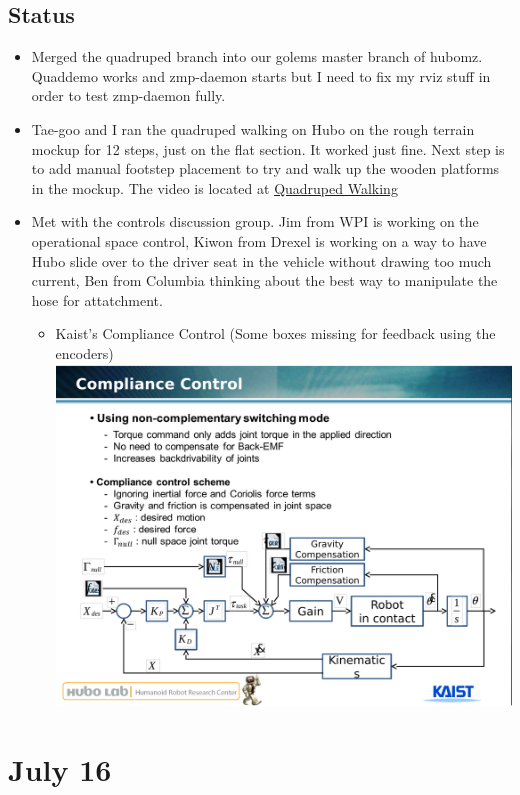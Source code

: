 \documentclass[letterpaper, 10 pt]{report}
\begin{document}
\subsection*{Status}
\begin{itemize}
\item Merged the quadruped branch into our golems master branch of hubomz. Quaddemo works and zmp-daemon starts but I need to fix my rviz stuff in order to test zmp-daemon fully.
\item Tae-goo and I ran the quadruped walking on Hubo on the rough terrain mockup for 12 steps, just on the flat section. It worked just fine. Next step is to add manual footstep placement to try and walk up the wooden platforms in the mockup.
The video is located at \href{http://www.youtube.com/watch?v=zqZra1Jmt9g&feature=youtu.be}{Quadruped Walking}
\item Met with the controls discussion group. Jim from WPI is working on the operational space control, Kiwon from Drexel is working on a way to have Hubo slide over to the driver seat in the vehicle without drawing too much current, Ben from Columbia thinking about the best way to manipulate the hose for attatchment.
\begin{itemize}
\item Kaist's Compliance Control (Some boxes missing for feedback using the encoders)
\newline \includegraphics[width=14.0cm]{resources/compliance-control}
\end{itemize}
\end{itemize}

\section*{July 16}
\end{document}
